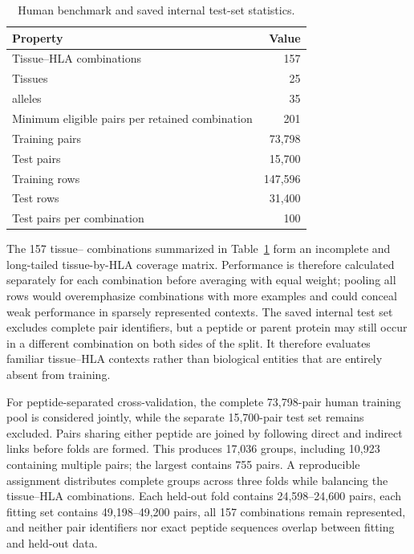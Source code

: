 \begin{table}[tbp]
\centering
\caption{Human benchmark and saved internal test-set statistics.}
\label{tab:human-benchmark-stats}
\small
\begin{tabularx}{\columnwidth}{@{}>{\raggedright\arraybackslash}Xr@{}}
\toprule
Property & Value \\
\midrule
Tissue--HLA combinations & 157 \\
Tissues & 25 \\
\plainHLA{} alleles & 35 \\
Minimum eligible pairs per retained combination & 201 \\
Training pairs & 73,798 \\
Test pairs & 15,700 \\
Training rows & 147,596 \\
Test rows & 31,400 \\
Test pairs per combination & 100 \\
\bottomrule
\end{tabularx}
\end{table}

The 157 tissue--\plainHLA{} combinations summarized in Table~\ref{tab:human-benchmark-stats} form an incomplete and long-tailed tissue-by-HLA coverage matrix. Performance is therefore calculated separately for each combination before averaging with equal weight; pooling all rows would overemphasize combinations with more examples and could conceal weak performance in sparsely represented contexts. The saved internal test set excludes complete pair identifiers, but a peptide or parent protein may still occur in a different combination on both sides of the split. It therefore evaluates familiar tissue--HLA contexts rather than biological entities that are entirely absent from training.

For peptide-separated cross-validation, the complete 73,798-pair human training pool is considered jointly, while the separate 15,700-pair test set remains excluded. Pairs sharing either peptide are joined by following direct and indirect links before folds are formed. This produces 17,036 groups, including 10,923 containing multiple pairs; the largest contains 755 pairs. A reproducible assignment distributes complete groups across three folds while balancing the tissue--HLA combinations. Each held-out fold contains 24,598--24,600 pairs, each fitting set contains 49,198--49,200 pairs, all 157 combinations remain represented, and neither pair identifiers nor exact peptide sequences overlap between fitting and held-out data.

